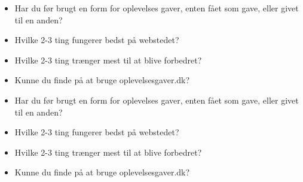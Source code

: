 \documentclass[12pt,a4paper,oneside]{article}
\begin{document}
\begin{itemize}

\item{Har du før brugt en form for oplevelses gaver, enten fået som gave, eller givet til en anden?}
\item{Hvilke 2-3 ting fungerer bedst på webstedet?}
\item{Hvilke 2-3 ting trænger mest til at blive forbedret?}
\item{Kunne du finde på at bruge oplevelsesgaver.dk?}
\item{Har du før brugt en form for oplevelses gaver, enten fået som gave, eller givet til en anden?}
\item{Hvilke 2-3 ting fungerer bedst på webstedet?}
\item{Hvilke 2-3 ting trænger mest til at blive forbedret?}
\item{Kunne du finde på at bruge oplevelsesgaver.dk?}

\end{itemize}
\end{document}
